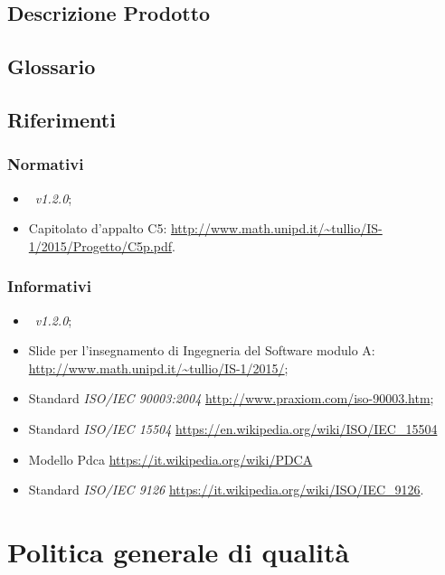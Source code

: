 \documentclass[12pt,a4paper]{article}
\begin{document}
\subsection{Descrizione Prodotto}
\descrizioneProdotto

\subsection{Glossario}
\glossarioPrint

\subsection{Riferimenti}

\subsubsection{Normativi}
\begin{itemize}
	\item \NdP\ \textit{v1.2.0};
	\item Capitolato d'appalto C5: \url{http://www.math.unipd.it/~tullio/IS-1/2015/Progetto/C5p.pdf}.
\end{itemize}

\subsubsection{Informativi}
\begin{itemize}
	\item \PdP\ \textit{v1.2.0};
	\item Slide per l'insegnamento di Ingegneria del Software modulo A: \url{http://www.math.unipd.it/~tullio/IS-1/2015/};
	\item Standard \textit{ISO/IEC 90003:2004} \url{http://www.praxiom.com/iso-90003.htm};
	\item Standard \textit{ISO/IEC 15504} \url{https://en.wikipedia.org/wiki/ISO/IEC_15504}
	\item Modello Pdca \url{https://it.wikipedia.org/wiki/PDCA}
	\item Standard \textit{ISO/IEC 9126} \url{https://it.wikipedia.org/wiki/ISO/IEC_9126}.
\end{itemize}

\newpage

\section{Politica generale di qualità}
\end{document}
